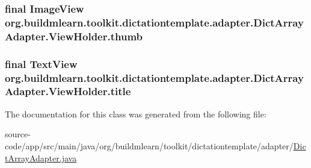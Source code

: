 \subsubsection[{\texorpdfstring{thumb}{thumb}}]{\setlength{\rightskip}{0pt plus 5cm}final Image\+View org.\+buildmlearn.\+toolkit.\+dictationtemplate.\+adapter.\+Dict\+Array\+Adapter.\+View\+Holder.\+thumb}\hypertarget{classorg_1_1buildmlearn_1_1toolkit_1_1dictationtemplate_1_1adapter_1_1DictArrayAdapter_1_1ViewHolder_a222738a3f0601644b987093f14cd5521}{}\label{classorg_1_1buildmlearn_1_1toolkit_1_1dictationtemplate_1_1adapter_1_1DictArrayAdapter_1_1ViewHolder_a222738a3f0601644b987093f14cd5521}
\subsubsection[{\texorpdfstring{title}{title}}]{\setlength{\rightskip}{0pt plus 5cm}final Text\+View org.\+buildmlearn.\+toolkit.\+dictationtemplate.\+adapter.\+Dict\+Array\+Adapter.\+View\+Holder.\+title}\hypertarget{classorg_1_1buildmlearn_1_1toolkit_1_1dictationtemplate_1_1adapter_1_1DictArrayAdapter_1_1ViewHolder_aba9443853c3b80d7bc8adad009b433d5}{}\label{classorg_1_1buildmlearn_1_1toolkit_1_1dictationtemplate_1_1adapter_1_1DictArrayAdapter_1_1ViewHolder_aba9443853c3b80d7bc8adad009b433d5}


The documentation for this class was generated from the following file\+:\begin{DoxyCompactItemize}
\item 
source-\/code/app/src/main/java/org/buildmlearn/toolkit/dictationtemplate/adapter/\hyperlink{DictArrayAdapter_8java}{Dict\+Array\+Adapter.\+java}\end{DoxyCompactItemize}
